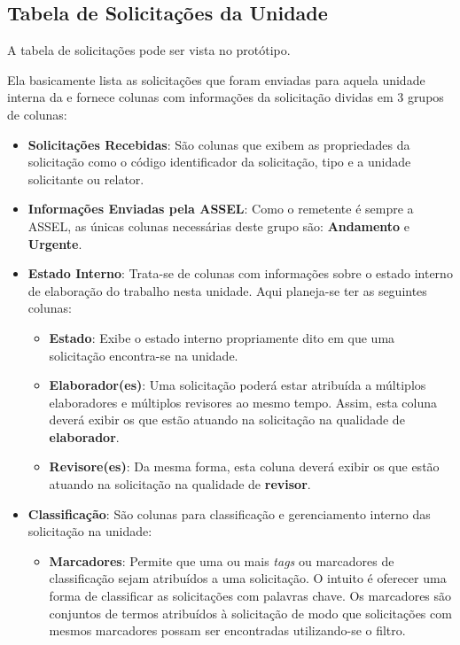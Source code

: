 	\subsection{Tabela de Solicitações da Unidade} 	
	
	A tabela de solicitações pode ser vista no protótipo. 

	Ela basicamente lista as solicitações que foram enviadas para aquela unidade interna da \ASSEL \xspace e fornece colunas com informações da solicitação dividas em 3 grupos de colunas:


	
	\begin{itemize}
		\item \textbf{Solicitações Recebidas}: São colunas que exibem as propriedades da solicitação como o código identificador da solicitação, tipo e a unidade solicitante ou relator. 
		
		\item \textbf{Informações Enviadas pela ASSEL}: Como o remetente é sempre a ASSEL, as únicas colunas necessárias deste grupo são: \textbf{Andamento} e \textbf{Urgente}.
		
		\item \textbf{Estado Interno}: Trata-se de colunas com informações sobre o estado interno de elaboração do trabalho nesta unidade. Aqui planeja-se ter as seguintes colunas: 
		\begin{itemize}
			\item \textbf{Estado}: Exibe o estado interno propriamente dito em que uma solicitação encontra-se na unidade.
			\item \textbf{Elaborador(es)}: Uma solicitação poderá estar atribuída a múltiplos elaboradores e múltiplos revisores ao mesmo tempo. Assim, esta coluna deverá exibir os \CLs que estão atuando na solicitação na qualidade de \textbf{elaborador}. 
			\item \textbf{Revisore(es)}: Da mesma forma, esta coluna deverá exibir os \CLs que estão atuando na solicitação na qualidade de \textbf{revisor}. 
		\end{itemize}



		\item \textbf{Classificação}: São colunas para classificação e gerenciamento interno das solicitação na unidade:
			\begin{itemize}
				\item \textbf{Marcadores}: Permite que uma ou mais \emph{tags} ou marcadores de classificação sejam atribuídos a uma solicitação. O intuito é oferecer uma forma de classificar as solicitações com palavras chave. Os marcadores são conjuntos de termos atribuídos à solicitação de modo que solicitações com mesmos marcadores possam ser encontradas utilizando-se o filtro. 


\end{itemize}
\end{itemize}
